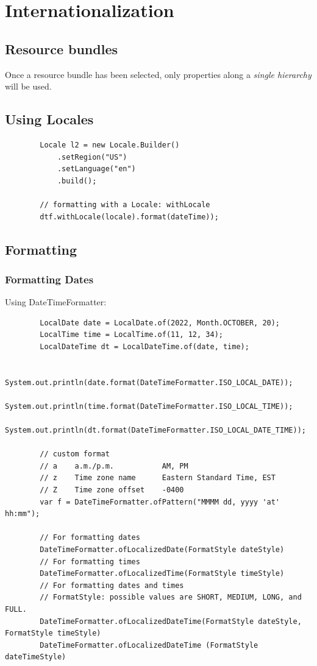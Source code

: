 \documentclass{scrartcl}
\begin{document}
\section{Internationalization}
\subsection{Resource bundles}

    Once a resource bundle has been selected, only properties along a \textit{single hierarchy} will be used.


\subsection{Using Locales}

    \begin{lstlisting}
        Locale l2 = new Locale.Builder()
            .setRegion("US")
            .setLanguage("en")
            .build();

        // formatting with a Locale: withLocale
        dtf.withLocale(locale).format(dateTime));

    \end{lstlisting}

\subsection{Formatting}
\subsubsection{Formatting Dates}

    Using DateTimeFormatter:

    \begin{lstlisting}
        LocalDate date = LocalDate.of(2022, Month.OCTOBER, 20);
        LocalTime time = LocalTime.of(11, 12, 34);
        LocalDateTime dt = LocalDateTime.of(date, time);

        System.out.println(date.format(DateTimeFormatter.ISO_LOCAL_DATE));
        System.out.println(time.format(DateTimeFormatter.ISO_LOCAL_TIME));
        System.out.println(dt.format(DateTimeFormatter.ISO_LOCAL_DATE_TIME));

        // custom format
        // a    a.m./p.m.           AM, PM
        // z	Time zone name	    Eastern Standard Time, EST
        // Z	Time zone offset    -0400
        var f = DateTimeFormatter.ofPattern("MMMM dd, yyyy 'at' hh:mm");

        // For formatting dates
        DateTimeFormatter.ofLocalizedDate(FormatStyle dateStyle)
        // For formatting times
        DateTimeFormatter.ofLocalizedTime(FormatStyle timeStyle)
        // For formatting dates and times
        // FormatStyle: possible values are SHORT, MEDIUM, LONG, and FULL.
        DateTimeFormatter.ofLocalizedDateTime(FormatStyle dateStyle, FormatStyle timeStyle)
        DateTimeFormatter.ofLocalizedDateTime (FormatStyle dateTimeStyle)



    \end{lstlisting}
\end{document}
